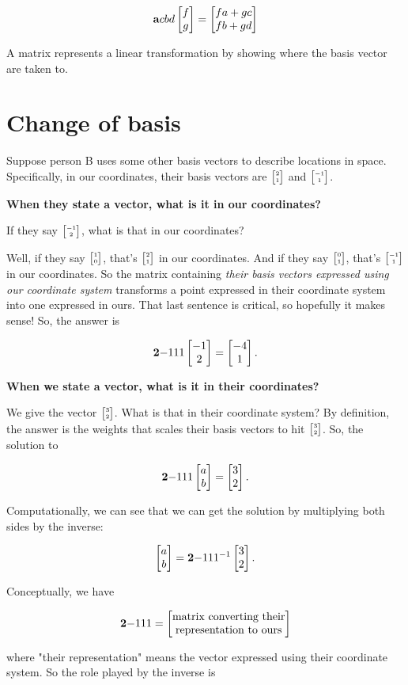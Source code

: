$$
\mathbf{a}{c}
    {b}{d} \begin{bmatrix}f\\g\end{bmatrix} = \begin{bmatrix}fa + gc\\fb + gd\end{bmatrix}
$$


A matrix represents a linear transformation by showing where the basis vector
are taken to.


\section{Change of basis}

Suppose person B uses some other basis vectors to describe locations in
space. Specifically, in our coordinates, their basis vectors are
$\tiny{\begin{bmatrix}2\\1\end{bmatrix}}$ and $\tiny{\begin{bmatrix}-1\\1\end{bmatrix}}$.


\textbf{When they state a vector, what is it in our coordinates?}

If they say $\tiny{\begin{bmatrix}-1\\2\end{bmatrix}}$, what is that in our coordinates?

Well, if they say $\tiny{\begin{bmatrix}1\\0\end{bmatrix}}$, that's $\tiny{\begin{bmatrix}2\\1\end{bmatrix}}$ in our coordinates. And
if they say $\tiny{\begin{bmatrix}0\\1\end{bmatrix}}$, that's $\tiny{\begin{bmatrix}-1\\1\end{bmatrix}}$ in our coordinates. So the
matrix containing \textit{their basis vectors expressed using our coordinate system}
transforms a point expressed in their coordinate system into one expressed in
ours. That last sentence is critical, so hopefully it makes sense! So, the answer is

$$
\mathbf{2}{-1}
    {1}{ 1} \begin{bmatrix}-1\\2\end{bmatrix} = \begin{bmatrix}-4\\1\end{bmatrix}.
$$


\textbf{When we state a vector, what is it in their coordinates?}

We give the vector $\tiny{\begin{bmatrix}3\\2\end{bmatrix}}$. What is that in their coordinate system? By
definition, the answer is the weights that scales their basis vectors to hit
$\tiny{\begin{bmatrix}3\\2\end{bmatrix}}$. So, the solution to

$$
\mathbf{2}{-1}
    {1}{1} \begin{bmatrix}a\\b\end{bmatrix} = \begin{bmatrix}3\\2\end{bmatrix}.
$$


Computationally, we can see that we can get the solution by multiplying both
sides by the inverse:

$$
\begin{bmatrix}a\\b\end{bmatrix} = \mathbf{2}{-1}
                  {1}{1}^{-1} \begin{bmatrix}3\\2\end{bmatrix}.
$$

Conceptually, we have

$$
\mathbf{2}{-1}
    {1}{1} =
\begin{bmatrix}\text{matrix converting their}\\\text{representation to ours} \\ \end{bmatrix}
$$

where "their representation" means the vector expressed using their coordinate
system. So the role played by the inverse is

